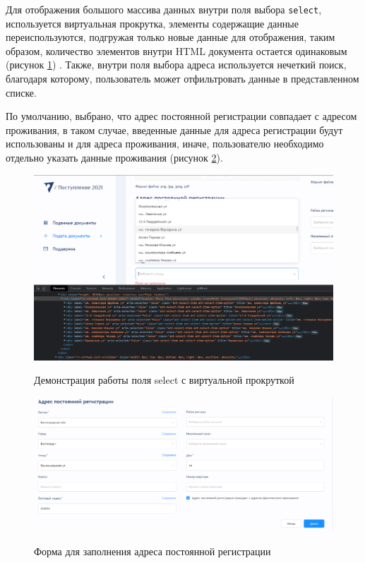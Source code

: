 Для отображения большого массива данных внутри поля выбора \verb|select|, используется виртуальная прокрутка, элементы содержащие данные переиспользуются, подгружая только новые данные для отображения, таким образом, количество элементов внутри HTML документа остается одинаковым (рисунок \ref{fig:virtualselect}) \cite{algoritm}. Также, внутри поля выбора адреса используется нечеткий поиск, благодаря которому, пользователь может отфильтровать данные в представленном списке. 

По умолчанию, выбрано, что адрес постоянной регистрации совпадает с адресом проживания, в таком случае, введенные данные для адреса регистрации будут использованы и для адреса проживания, иначе, пользователю необходимо отдельно указать данные проживания (рисунок \ref{fig:adressinput}).

\begin{figure}[H]
\begin{center}
\includegraphics[width=0.9\hsize]{fig/virtual-select.png}\\[2mm]
\caption{Демонстрация работы поля select с виртуальной прокруткой}\label{fig:virtualselect}
\end{center}
\end{figure}

\begin{figure}[H]
\begin{center}
\includegraphics[width=0.9\hsize]{fig/address-input.png}\\[2mm]
\caption{Форма для заполнения адреса постоянной регистрации}\label{fig:adressinput}
\end{center}
\end{figure}


